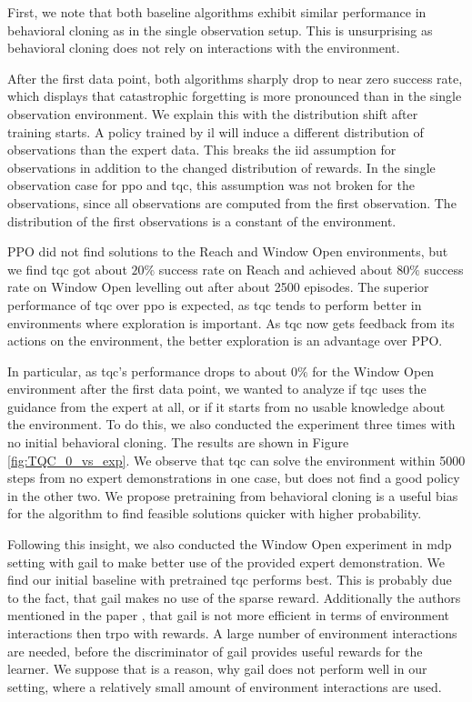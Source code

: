 First, we note that both baseline algorithms exhibit similar performance in behavioral cloning as in the single 
observation setup. This is unsurprising as behavioral cloning does not rely on interactions with the environment.

After the first data point, both algorithms sharply drop to near zero success rate, which displays that catastrophic forgetting is more 
pronounced than in the single observation environment. We explain this with the distribution shift after training starts. A policy trained by \ac{il} 
will induce a different distribution of observations than the expert data. This breaks the \ac{iid} assumption for observations in addition to the changed distribution of rewards. 
In the single observation case for \ac{ppo} and \ac{tqc}, this assumption was not broken for the observations, 
since all observations are computed from the first observation. The distribution of the first observations is a constant of the environment.

PPO did not find solutions to the Reach and Window Open environments, 
but we find \ac{tqc} got about $20 \%$ success rate on Reach and achieved about $80 \%$ success rate on Window Open levelling out after about 2500 episodes. 
The superior performance of \ac{tqc} over \ac{ppo} is expected, as \ac{tqc} tends to perform better in environments where exploration is important. As \ac{tqc} now gets 
feedback from its actions on the environment, the better exploration is an advantage over PPO.

In particular, as \ac{tqc}'s performance drops to about $0 \%$ for the Window Open 
environment after the first data point, we wanted to analyze if \ac{tqc} uses the guidance from the expert at all, or if it starts from 
no usable knowledge about the environment. To do this, we also conducted the experiment three times with no initial behavioral cloning. The results are shown in 
Figure \ref{fig:TQC_0_vs_exp}. We observe that \ac{tqc} can solve the environment within 5000 steps from no expert demonstrations in one case, but does not find a good policy in the other two. 
We propose pretraining from behavioral cloning is a useful bias for the algorithm to find feasible solutions quicker with higher probability.

Following this insight, 
we also conducted the Window Open experiment in \ac{mdp} setting with \ac{gail} to make better use of the provided expert demonstration. We find our initial 
baseline with pretrained \ac{tqc} performs best. This is probably due to the fact, that \ac{gail} makes no use of the sparse reward. Additionally 
the authors mentioned in the paper \cite{ho2016generative}, that \ac{gail} is not more efficient in terms of environment interactions then \ac{trpo} with rewards. A large number of 
environment interactions are needed, before the discriminator of \ac{gail} provides useful rewards for the learner. We suppose that is a reason, why \ac{gail} does not perform 
well in our setting, where a relatively small amount of environment interactions are used.

